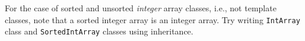 For the case of sorted and unsorted \textit{integer} array classes, 
i.e., not template classes, note that
a sorted integer array is an integer array.
Try writing \verb!IntArray! class and \verb!SortedIntArray! classes
using inheritance.
